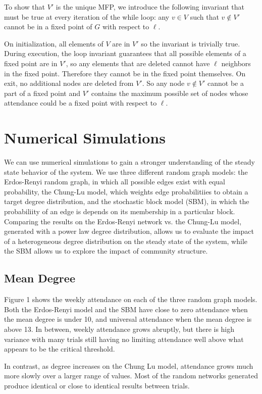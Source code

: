\documentclass[12pt]{article}
\begin{document}
  To show that $V'$ is the unique MFP, we introduce the following invariant that must be true at every iteration of the while loop: any $v \in V$ such that $v \notin V'$ cannot be in a fixed point of $G$ with respect to $\ell$.

  On initialization, all elements of $V$ are in $V'$ so the invariant is trivially true.  During execution, the loop invariant guarantees that all possible elements of a fixed point are in $V'$, so any elements that are deleted cannot have $\ell$ neighbors in the fixed point.  Therefore they cannot be in the fixed point themselves.  On exit, no additional nodes are deleted from $V'$.  So any node $v \notin V'$ cannot be a part of a fixed point and $V'$ contains the maximum possible set of nodes whose attendance could be a fixed point with respect to $\ell$. 

\section{Numerical Simulations}
We can use numerical simulations to gain a stronger understanding of the steady state behavior of the system.  We use three different random graph models: the Erdos-Renyi random graph, in which all possible edges exist with equal probability, the Chung-Lu model, which weights edge probabilitiies to obtain a target degree distribution, and the stochastic block model (SBM), in which the probabiliity of an edge is depends on its membership in a particular block.  Comparing the results on the Erdos-Renyi network vs. the Chung-Lu model, generated with a power law degree distribution, allows us to evaluate the impact of a heterogeneous degree distribution on the steady state of the system, while the SBM allows us to explore the impact of community structure.

\subsection{Mean Degree}
Figure 1 shows the weekly attendance on each of the three random graph models.  Both the Erdos-Renyi model and the SBM have close to zero attendance when the mean degree is under 10, and universal attendance when the mean degree is above 13.  In between, weekly attendance grows abruptly, but there is high variance with many trials still having no limiting attendance well above what appears to be the critical threshold.

In contrast, as degree increases on the Chung Lu model, attendance grows much more slowly over a larger range of values.  Most of the random networks generated produce identical or close to identical results between trials.
\end{document}
